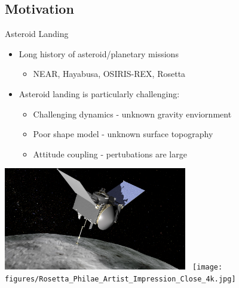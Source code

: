 \documentclass[11pt,professionalfonts]{beamer}
\begin{document}
\subsection*{Motivation}  
\begin{frame}{Asteroid Landing}
    \begin{itemize}
        \item Long history of asteroid/planetary missions
            \begin{itemize}
                \item NEAR, Hayabusa, OSIRIS-REX, Rosetta
            \end{itemize}
            \pause
        \item Asteroid landing is particularly challenging:
            \begin{itemize}
                \item<2-> Challenging dynamics - unknown gravity enviornment
                \item<2-> Poor shape model - unknown surface topography
                \item<2-> Attitude coupling - pertubations are large 
            \end{itemize}
    \end{itemize}
    \begin{center}
        \includegraphics[width=0.6\textwidth,height=0.4\textheight,keepaspectratio]{figures/osiris_rex.png}~
        \texttt{[image: figures/Rosetta\_Philae\_Artist\_Impression\_Close\_4k.jpg]}
    \end{center} 
\end{frame}
\end{document}

